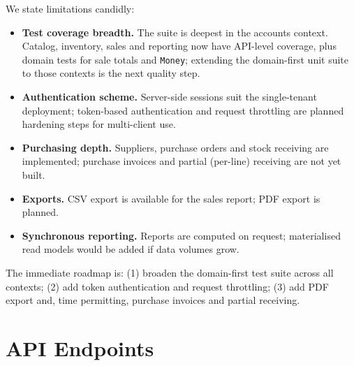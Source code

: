 \documentclass[11pt,a4paper]{article}
\begin{document}
We state limitations candidly:

\begin{itemize}[leftmargin=1.4em]
  \item \textbf{Test coverage breadth.} The suite is deepest in the accounts context. Catalog,
  inventory, sales and reporting now have API-level coverage, plus domain tests for sale totals and
  \texttt{Money}; extending the domain-first unit suite to those contexts is the next quality step.
  \item \textbf{Authentication scheme.} Server-side sessions suit the single-tenant deployment;
  token-based authentication and request throttling are planned hardening steps for multi-client use.
  \item \textbf{Purchasing depth.} Suppliers, purchase orders and stock receiving are implemented;
  purchase invoices and partial (per-line) receiving are not yet built.
  \item \textbf{Exports.} CSV export is available for the sales report; PDF export is planned.
  \item \textbf{Synchronous reporting.} Reports are computed on request; materialised read models
  would be added if data volumes grow.
\end{itemize}

\noindent
The immediate roadmap is: (1) broaden the domain-first test suite across all contexts; (2) add
token authentication and request throttling; (3) add PDF export and, time permitting, purchase
invoices and partial receiving.

\appendix
\section{API Endpoints}
\label{app:api}
\end{document}
